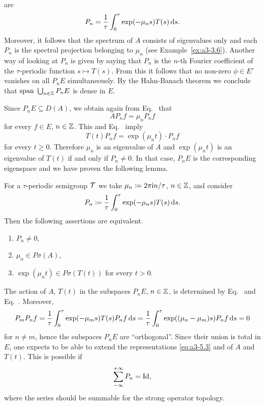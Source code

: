 are
\begin{equation}\label{eq:a3-5.2}
P_{n} = \frac{1}{\tau}\int_{0}^{\tau}\exp(-\mu_{n}s)T(s)  \mathop{}\!\mathrm{d}{s} .
\end{equation}
Moreover, it follows that the spectrum of\/ $A$ consists of eigenvalues only and each $P_{n}$ is the spectral projection belonging to $\mu_{n}$ (see Example~\ref{ex:a3-3.6}). 
Another way of looking at $P_{n}$ is given by saying that $P_{n}$ is the $n$-th Fourier coefficient of the $\tau$-periodic function $s \mapsto T(s)$.
From this it follows that no non-zero $\phi \in E'$ vanishes on all $P_{n}E$ simultaneously.
By the Hahn-Banach theorem we conclude that $\text{span } \bigcup_{n \in \mathbb{Z}} P_{n}E$ is dense in $E$.

Since $P_{n}E \subseteq D(A)$, we obtain again from Eq.~ that
\begin{equation}\label{eq:a3-5.3}
AP_{n}f = \mu_{n}P_{n}f
\end{equation}
for every $f \in E$, $n \in \mathbb{Z}$.
This and Eq.~ imply
\begin{equation}\label{eq:a3-5.4}
T(t)P_{n}f = \exp(\mu_{n}t) \cdot P_{n}f
\end{equation}
for every $t \geq 0$.
Therefore $\mu_{n}$ is an eigenvalue of\/ $A$ and $\exp(\mu_{n}t)$ is an eigenvalue of\/ $T(t)$ if and only if\/ $P_{n} \neq 0$.
In that case, $P_{n}E$ is the corresponding eigenspace and we have proven the following lemma.
\begin{lemma}\label{lem:a3-5.3}
For a $\tau$-periodic semigroup $\mathcal{T}$ we take $\mu_{n} \coloneq 2\pi\mathrm{i} n/\tau$, $n \in \mathbb{Z}$, and consider
\[
P_{n} \coloneq \frac{1}{\tau}\int_{0}^{\tau} \exp(-\mu_{n}s)T(s)  \mathop{}\!\mathrm{d}{s} .
\]
Then the following assertions are equivalent.
\begin{enumerate}[\upshape (a)]
\item 
$P_{n} \neq 0$,

\item 
$\mu_{n} \in P\sigma(A)$,

\item 
$\exp(\mu_{n}t) \in P\sigma(T(t))$ for every $t > 0$. 

\end{enumerate}
\end{lemma}
The action of\/ $A$, \resp $T(t)$ in the subspaces $P_{n}E$, $n \in \mathbb{Z}$, is determined by Eq.~ and Eq.~.
Moreover,
\[
	P_{m}P_{n}f =  \frac{1}{\tau}\int_{0}^{\tau} \exp(-\mu_{m}s)T(s)P_{n}f  \mathop{}\!\mathrm{d}{s} 
	=  \frac{1}{\tau}\int_{0}^{\tau} \exp((\mu_{n}-\mu_{m})s)P_{n}f  \mathop{}\!\mathrm{d}{s} = 0
\]
for $n \neq m$, hence the subspaces $P_{n}E$ are \enquote{orthogonal}.
Since their union is total in $E$, one expects to be able to extend the representations \eqref{eq:a3-5.3} and  of\/ $A$ and $T(t)$.
This is possible if
\[
	\sum_{-\infty}^{+\infty} P_{n} = \operatorname{Id} ,
\]
where the series should be summable for the strong operator topology.

